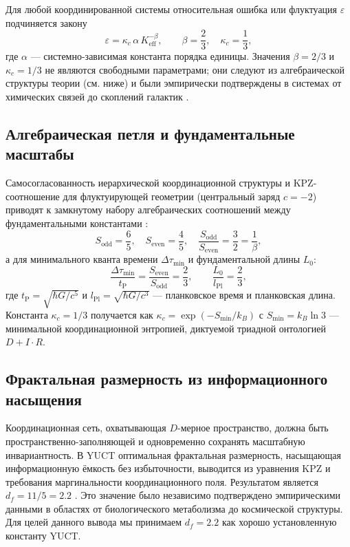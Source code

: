 \documentclass[11pt,a4paper]{article}
\newcommand{\kappac}{\kappa_c}
\newcommand{\Keff}{K_{\mathrm{eff}}}
\newcommand{\betaf}{\beta}
\newcommand{\Lpl}{l_{\mathrm{Pl}}}
\newcommand{\tP}{t_{\mathrm{P}}}
\newcommand{\Sodd}{S_{\mathrm{odd}}}
\newcommand{\Seven}{S_{\mathrm{even}}}
\newcommand{\Dtau}{\Delta\tau_{\min}}
\newcommand{\Lzero}{L_0}
\begin{document}
	Для любой координированной системы относительная ошибка или флуктуация \(\varepsilon\) подчиняется закону
	\begin{equation}
		\varepsilon = \kappac \, \alpha \, \Keff^{-\betaf}, \qquad \betaf = \frac{2}{3}, \quad \kappac = \frac{1}{3},
		\label{eq:universal}
	\end{equation}
	где \(\alpha\) — системно-зависимая константа порядка единицы. Значения \(\betaf = 2/3\) и \(\kappac = 1/3\) не являются свободными параметрами; они следуют из алгебраической структуры теории (см. ниже) и были эмпирически подтверждены в системах от химических связей до скоплений галактик \cite{AppendixL}.
	
	\subsection{Алгебраическая петля и фундаментальные масштабы}
	
	Самосогласованность иерархической координационной структуры и KPZ-соотношение для флуктуирующей геометрии (центральный заряд \(c=-2\)) приводят к замкнутому набору алгебраических соотношений между фундаментальными константами \cite{AppendixY}:
	\begin{equation}
		\Sodd = \frac{6}{5},\quad \Seven = \frac{4}{5},\quad \frac{\Sodd}{\Seven} = \frac{3}{2} = \frac{1}{\betaf},
	\end{equation}
	а для минимального кванта времени \(\Dtau\) и фундаментальной длины \(\Lzero\):
	\begin{equation}
		\frac{\Dtau}{\tP} = \frac{\Seven}{\Sodd} = \frac{2}{3}, \qquad \frac{\Lzero}{\Lpl} = \frac{2}{3},
		\label{eq:algebraic-loop}
	\end{equation}
	где \(\tP = \sqrt{\hbar G / c^5}\) и \(\Lpl = \sqrt{\hbar G / c^3}\) — планковское время и планковская длина. Константа \(\kappac = 1/3\) получается как \(\kappac = \exp(-S_{\min}/k_B)\) с \(S_{\min} = k_B \ln 3\) — минимальной координационной энтропией, диктуемой триадной онтологией \(D + I \cdot R\).
	
	\subsection{Фрактальная размерность из информационного насыщения}
	
	Координационная сеть, охватывающая \(D\)-мерное пространство, должна быть пространственно-заполняющей и одновременно сохранять масштабную инвариантность. В YUCT оптимальная фрактальная размерность, насыщающая информационную ёмкость без избыточности, выводится из уравнения KPZ и требования маргинальности координационного поля. Результатом является \(d_f = 11/5 = 2.2\) \cite{AppendixL}. Это значение было независимо подтверждено эмпирическими данными в областях от биологического метаболизма до космической структуры. Для целей данного вывода мы принимаем \(d_f = 2.2\) как хорошо установленную константу YUCT.
	
\end{document}
